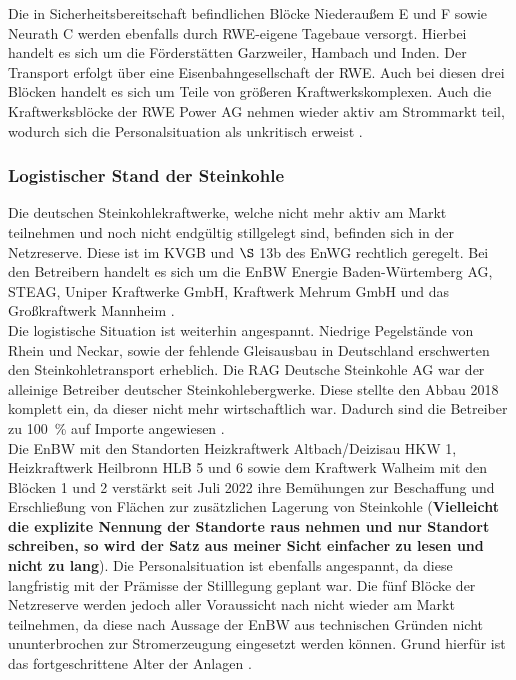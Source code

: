 			Die in Sicherheitsbereitschaft befindlichen Blöcke Niederaußem E und F sowie Neurath C werden ebenfalls durch RWE-eigene Tagebaue versorgt. 
			Hierbei handelt es sich um die Förderstätten Garzweiler, Hambach und Inden. 
			Der Transport erfolgt über eine Eisenbahngesellschaft der RWE. 
			Auch bei diesen drei Blöcken handelt es sich um Teile von größeren Kraftwerkskomplexen. 
			Auch die Kraftwerksblöcke der RWE Power AG nehmen wieder aktiv am Strommarkt teil, wodurch sich die Personalsituation als unkritisch erweist \cite{Mail_RWE}. 
	
		\subsubsection{Logistischer Stand der Steinkohle} \label{sect: Steinkohle}
		
			Die deutschen Steinkohlekraftwerke, welche nicht mehr aktiv am Markt teilnehmen und noch nicht endgültig stillgelegt sind, befinden sich in der Netzreserve. 
			Diese ist im KVGB und $\S$ 13b des EnWG rechtlich geregelt. 
			Bei den Betreibern handelt es sich um die EnBW Energie Baden-Würtemberg AG, STEAG, Uniper Kraftwerke GmbH, Kraftwerk Mehrum GmbH und das Großkraftwerk Mannheim \cite{Excel_Kraftwerksliste}. \\
			
			Die logistische Situation ist weiterhin angespannt. 
			Niedrige Pegelstände von Rhein und Neckar, sowie der fehlende Gleisausbau in Deutschland erschwerten den Steinkohletransport erheblich. 
			Die RAG Deutsche Steinkohle AG war der alleinige Betreiber deutscher Steinkohlebergwerke. 
			Diese stellte den Abbau 2018 komplett ein, da dieser nicht mehr wirtschaftlich war.
			Dadurch sind die Betreiber zu \SI{100}{\percent} auf Importe angewiesen \cite{Ende_Steinkohle}. \\
			
			Die EnBW mit den Standorten Heizkraftwerk Altbach/Deizisau HKW 1, Heizkraftwerk Heilbronn HLB 5 und 6 sowie dem Kraftwerk Walheim mit den Blöcken 1 und 2 verstärkt seit Juli 2022 ihre Bemühungen zur Beschaffung und Erschließung von Flächen zur zusätzlichen Lagerung von Steinkohle (\textbf{Vielleicht die explizite Nennung der Standorte raus nehmen und nur Standort schreiben, so wird der Satz aus meiner Sicht einfacher zu lesen und nicht zu lang}).
			Die Personalsituation ist ebenfalls angespannt, da diese langfristig mit der Prämisse der Stilllegung geplant war. 
			Die fünf Blöcke der Netzreserve werden jedoch aller Voraussicht nach nicht wieder am Markt teilnehmen, da diese nach Aussage der EnBW aus technischen Gründen nicht ununterbrochen zur Stromerzeugung eingesetzt werden können. 
			Grund hierfür ist das fortgeschrittene Alter der Anlagen \cite{EnBW_Steinkohle}. \\
			
